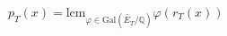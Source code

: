 \documentclass[preview]{standalone}
\begin{document}
\begin{center}
$\displaystyle p_T(x) = \text{lcm}_{\varphi \in \text{Gal}\left(\widetilde{E_T}/\mathbb{Q}\right)} \varphi(r_T(x))$
\end{center}
\end{document}
